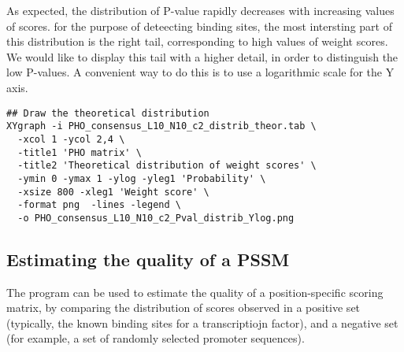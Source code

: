 As expected, the distribution of P-value rapidly decreases with
increasing values of scores. for the purpose of deteecting binding
sites, the most intersting part of this distribution is the right
tail, corresponding to high values of weight scores. We would like to
display this tail with a higher detail, in order to distinguish the
low P-values. A convenient way to do this is to use a logarithmic
scale for the Y axis.

{\color{Blue} \begin{footnotesize} 
\begin{verbatim}
## Draw the theoretical distribution
XYgraph -i PHO_consensus_L10_N10_c2_distrib_theor.tab \
  -xcol 1 -ycol 2,4 \
  -title1 'PHO matrix' \
  -title2 'Theoretical distribution of weight scores' \
  -ymin 0 -ymax 1 -ylog -yleg1 'Probability' \
  -xsize 800 -xleg1 'Weight score' \
  -format png  -lines -legend \
  -o PHO_consensus_L10_N10_c2_Pval_distrib_Ylog.png
\end{verbatim} \end{footnotesize}
}


\subsection{Estimating the quality of a PSSM}

The program \program{matrix-quality} can be used to estimate the
quality of a position-specific scoring matrix, by comparing the
distribution of scores observed in a positive set (typically, the
known binding sites for a transcriptiojn factor), and a negative set
(for example, a set of randomly selected promoter sequences).

